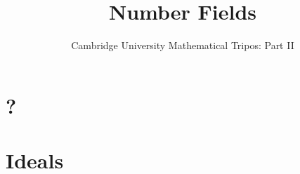 \documentclass{article}
\title{Number Fields}
\author{Cambridge University Mathematical Tripos: Part II}
\begin{document}
\maketitle

\tableofcontentsnewpage{}

\section{?}

\section{Ideals}

\end{document}
